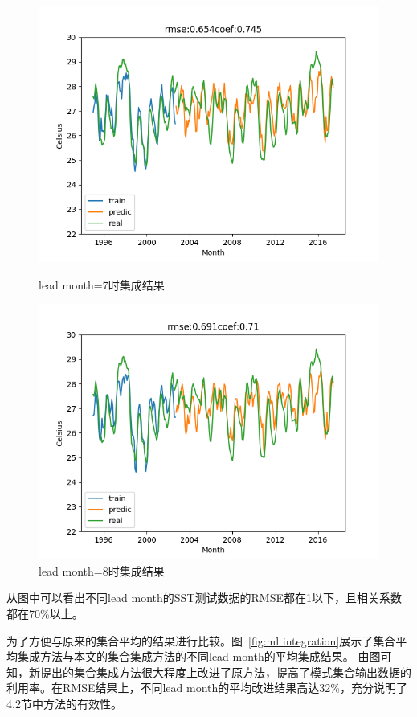\begin{figure}[H]
{\begin{minipage}[t]{0.48\textwidth}
\centering
\includegraphics[scale=0.4]{figures/all_naive_7.png}
\caption{lead month=7时集成结果}
\end{minipage}
\begin{minipage}[t]{0.48\textwidth}
\centering
\includegraphics[scale=0.4]{figures/all_naive_8.png}
\caption{lead month=8时集成结果}
\end{minipage}
}
\end{figure}

从图中可以看出不同lead month的SST测试数据的RMSE都在1以下，且相关系数都在70\%以上。

为了方便与原来的集合平均的结果进行比较。图~\ref{fig:ml integration}展示了集合平均集成方法与本文的集合集成方法的不同lead month的平均集成结果。 由图可知，新提出的集合集成方法很大程度上改进了原方法，提高了模式集合输出数据的利用率。在RMSE结果上，不同lead month的平均改进结果高达32\%，充分说明了4.2节中方法的有效性。

